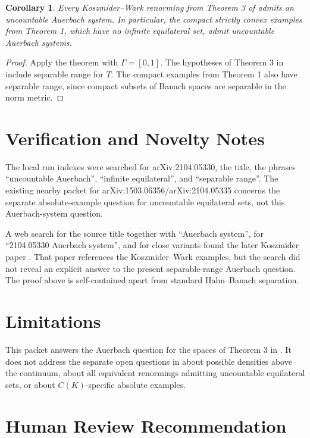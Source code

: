 \documentclass[11pt]{article}
\newtheorem{corollary}{Corollary}
\newcommand{\GammaSet}{\Gamma}
\begin{document}
\begin{corollary}
Every Koszmider--Wark renorming from Theorem 3 of \cite{KW} admits an
uncountable Auerbach system.  In particular, the compact strictly convex
examples from Theorem 1, which have no infinite equilateral set, admit
uncountable Auerbach systems.
\end{corollary}

\begin{proof}
Apply the theorem with \(\GammaSet=[0,1]\).  The hypotheses of Theorem 3 in
\cite{KW} include separable range for \(T\).  The compact examples from
Theorem 1 also have separable range, since compact subsets of Banach spaces
are separable in the norm metric.
\end{proof}

\section*{Verification and Novelty Notes}

The local run indexes were searched for arXiv:2104.05330, the title, the
phrases ``uncountable Auerbach'', ``infinite equilateral'', and ``separable
range''.  The existing nearby packet for arXiv:1503.06356/arXiv:2104.05335
concerns the separate absolute-example question for uncountable equilateral
sets, not this Auerbach-system question.

A web search for the source title together with ``Auerbach system'', for
``2104.05330 Auerbach system'', and for close variants found the later
Koszmider paper \cite{K2023}.  That paper references the Koszmider--Wark
examples, but the search did not reveal an explicit answer to the present
separable-range Auerbach question.  The proof above is self-contained apart
from standard Hahn--Banach separation.

\section*{Limitations}

This packet answers the Auerbach question for the spaces of Theorem 3 in
\cite{KW}.  It does not address the separate open questions in \cite{KW}
about possible densities above the continuum, about all equivalent renormings
admitting uncountable equilateral sets, or about \(C(K)\)-specific absolute
examples.

\section*{Human Review Recommendation}
\end{document}
